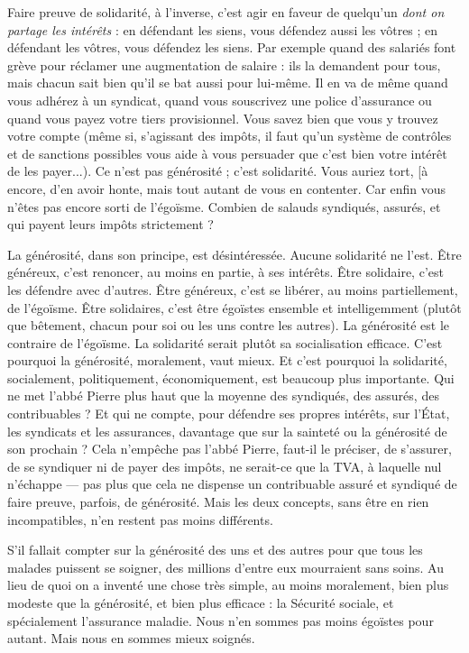 Faire preuve de solidarité, à l'inverse, c’est agir en faveur de quelqu'un {\it dont
on partage les intérêts} : en défendant les siens, vous défendez aussi les vôtres ; en
défendant les vôtres, vous défendez les siens. Par exemple quand des salariés
font grève pour réclamer une augmentation de salaire : ils la demandent pour
tous, mais chacun sait bien qu’il se bat aussi pour lui-même. Il en va de même
quand vous adhérez à un syndicat, quand vous souscrivez une police d’assurance
ou quand vous payez votre tiers provisionnel. Vous savez bien que vous
y trouvez votre compte (même si, s'agissant des impôts, il faut qu’un système
de contrôles et de sanctions possibles vous aide à vous persuader que c’est bien
votre intérêt de les payer...). Ce n’est pas générosité ; c’est solidarité. Vous
auriez tort, [à encore, d’en avoir honte, mais tout autant de vous en contenter.
Car enfin vous n'êtes pas encore sorti de l’égoïsme. Combien de salauds syndiqués,
assurés, et qui payent leurs impôts strictement ?

La générosité, dans son principe, est désintéressée. Aucune solidarité ne
l'est. Être généreux, c’est renoncer, au moins en partie, à ses intérêts. Être solidaire,
c’est les défendre avec d’autres. Être généreux, c’est se libérer, au moins
partiellement, de l’égoïsme. Être solidaires, c’est être égoïstes ensemble et intelligemment
(plutôt que bêtement, chacun pour soi ou les uns contre les autres).
La générosité est le contraire de l’égoïsme. La solidarité serait plutôt sa socialisation
efficace. C’est pourquoi la générosité, moralement, vaut mieux. Et c’est
pourquoi la solidarité, socialement, politiquement, économiquement, est beaucoup
plus importante. Qui ne met l'abbé Pierre plus haut que la moyenne des
syndiqués, des assurés, des contribuables ? Et qui ne compte, pour défendre ses
propres intérêts, sur l’État, les syndicats et les assurances, davantage que sur la
sainteté ou la générosité de son prochain ? Cela n’empêche pas l’abbé Pierre,
faut-il le préciser, de s’assurer, de se syndiquer ni de payer des impôts, ne serait-ce
que la TVA, à laquelle nul n'échappe — pas plus que cela ne dispense un
contribuable assuré et syndiqué de faire preuve, parfois, de générosité. Mais
les deux concepts, sans être en rien incompatibles, n’en restent pas moins différents.

S’il fallait compter sur la générosité des uns et des autres pour que tous les
malades puissent se soigner, des millions d’entre eux mourraient sans soins. Au
lieu de quoi on a inventé une chose très simple, au moins moralement, bien
plus modeste que la générosité, et bien plus efficace : la Sécurité sociale, et spécialement
l'assurance maladie. Nous n’en sommes pas moins égoïstes pour
autant. Mais nous en sommes mieux soignés.


